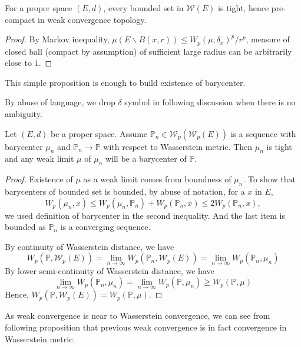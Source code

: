\begin{prop}
	For a proper space $(E,d)$, every bounded set in $\mathcal{W}(E)$ is tight, hence pre-compact in weak convergence topology.
\end{prop}
\begin{proof}
	By Markov inequality, $\mu(E\backslash B(x,r)) \leq W_p(\mu, \delta_x)^p/r^p$, measure of closed ball (compact by assumption) of sufficient large radius can be arbitrarily close to $1$.
\end{proof}

This simple proposition is enough to build existence of barycenter.

By abuse of language, we drop $\delta$ symbol in following discussion when there is no ambiguity.
\begin{thm}
	Let $(E,d)$ be a proper space. Assume $\mathbb{P}_n \in \mathcal{W}_p(\mathcal{W}_p(E))$ is a sequence with barycenter $\mu_n$ and $\mathbb{P}_n \rightarrow \mathbb{P}$ with respect to Wasserstein metric. Then $\mu_n$ is tight and any weak limit $\mu$ of $\mu_n$ will be a barycenter of $\mathbb{P}$.
\end{thm}

\begin{proof}
	Existence of $\mu$ as a weak limit comes from boundness of $\mu_n$.
	To show that barycenters of bounded set is bounded, by abuse of notation, for a $x$ in $E$,
	\[
		W_p(\mu_n, x) \leq W_p(\mu_n, \mathbb{P}_n)  + W_p(\mathbb{P}_n, x) \leq 2 W_p(\mathbb{P}_n , x),
	\]
	we used definition of barycenter in the second inequality.
	And the last item is bounded as $\mathbb{P}_n$ is a converging sequence.

	By continuity of Wasserstein distance, we have
	\[
		W_p(\mathbb{P}, \mathcal{W}_p(E)) = \lim_{n \rightarrow \infty}W_p(\mathbb{P}_n, \mathcal{W}_p(E))=\lim_{n \rightarrow \infty}W_p(\mathbb{P}_n, \mu_n)
	\]
	By lower semi-continuity of Wasserstein distance, we have
	\[
		\lim_{n \rightarrow \infty}W_p(\mathbb{P}_n, \mu_n)=\lim_{n \rightarrow \infty}W_p(\mathbb{P}, \mu_n)\geq W_p(\mathbb{P}, \mu)
	\]
	Hence, $W_p(\mathbb{P}, \mathcal{W}_p(E)) =W_p(\mathbb{P}, \mu)$.
\end{proof}

As weak convergence is near to Wasserstein convergence, we can see from following proposition that previous weak convergence is in fact convergence in Wasserstein metric.

